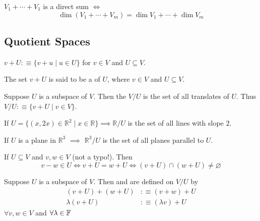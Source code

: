 \begin{thm}
  \label{thm: a sum is a direct sum if and only if the dimensions add up}
  $V_1 + \cdots + V_1$ is a direct sum $\iff$
  \begin{equation}
    \dim (V_1+\cdots+V_m) = \dim V_1 + \cdots + \dim V_m
  \end{equation}
\end{thm}

\subsection{Quotient Spaces}

\setcounter{thm}{94}
\begin{mydef} [notation $v+U$]
  $v+U :\equiv \{v+u \mid u\in U\}$ for $v\in V$ and $U\subseteq V$.
\end{mydef}

\setcounter{thm}{96}
\begin{mydef} [translate]
  The set $v+U$ is said to be a  of $U$, where $v\in V$ and $U \subseteq V$.
\end{mydef}

\setcounter{thm}{98}
\begin{mydef} 
  Suppose $U$ is a subspace of $V$. Then the  $V/U$ is the set of all translates of $U$. Thus
  $V/U :\equiv \{v+U \mid v\in V\}$.
\end{mydef}

\begin{example}
  If $U=\{ (x,2x)\in \mathbb{R}^2 \mid x\in \mathbb{R} \} \implies \mathbb{R}/U$ is the set of all lines with slope $2$.

  If $U$ is a plane in $\mathbb{R}^3$ $\implies$ $\mathbb{R}^3/U$ is the set of all planes parallel to $U$.
\end{example}

\setcounter{thm}{100}
\begin{thm} 
  If $ U \subseteq V$ and $v,w\in V$ (not a typo!). Then
  \begin{equation}
    v-w \in U \iff v+U = w + U \iff (v+U)\cap (w+U) \neq \varnothing
  \end{equation}
\end{thm}

\begin{mydef} 
  Suppose $U$ is a subspace of $V$. Then  and  are defined on $V/U$ by
  \begin{equation}
    \begin{aligned}
      (v+U)+(w+U) & :\equiv (v+w) + U \\
      \lambda (v+U) & :\equiv (\lambda v) + U
    \end{aligned}
  \end{equation}
  $\forall v,w \in V$ and $\forall \lambda \in \mathbb{F}$
\end{mydef}


